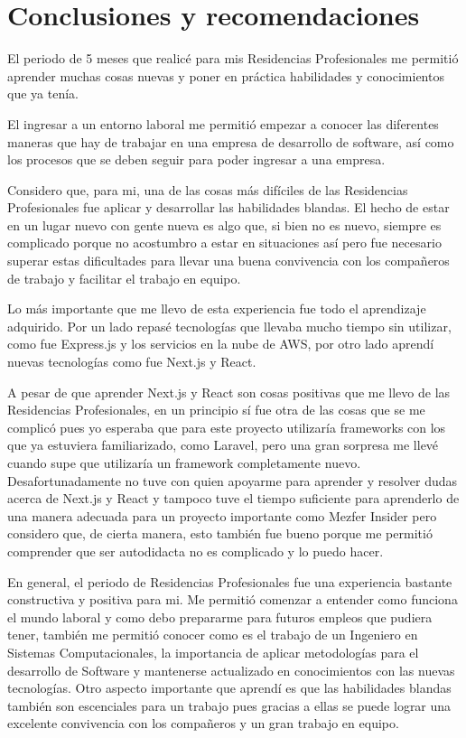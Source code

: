 \chapter{Conclusiones y recomendaciones}
El periodo de 5 meses que realicé para mis Residencias Profesionales me permitió aprender muchas cosas nuevas y poner en práctica habilidades y conocimientos que ya tenía.

El ingresar a un entorno laboral me permitió empezar a conocer las diferentes maneras que hay de trabajar en una empresa de desarrollo de software, así como los procesos que se deben seguir para poder ingresar a una empresa.

Considero que, para mi, una de las cosas más difíciles de las Residencias Profesionales fue aplicar y desarrollar las habilidades blandas. El hecho de estar en un lugar nuevo con gente nueva es algo que, si bien no es nuevo, siempre es complicado porque no acostumbro a estar en situaciones así pero fue necesario superar estas dificultades para llevar una buena convivencia con los compañeros de trabajo y facilitar el trabajo en equipo.

Lo más importante que me llevo de esta experiencia fue todo el aprendizaje adquirido. Por un lado repasé tecnologías que llevaba mucho tiempo sin utilizar, como fue Express.js y los servicios en la nube de AWS, por otro lado aprendí nuevas tecnologías como fue Next.js y React. 

A pesar de que aprender Next.js y React son cosas positivas que me llevo de las Residencias Profesionales, en un principio sí fue otra de las cosas que se me complicó pues yo esperaba que para este proyecto utilizaría frameworks con los que ya estuviera familiarizado, como Laravel, pero una gran sorpresa me llevé cuando supe que utilizaría un framework completamente nuevo. Desafortunadamente no tuve con quien apoyarme para aprender y resolver dudas acerca de Next.js y React y tampoco tuve el tiempo suficiente para aprenderlo de una manera adecuada para un proyecto importante como Mezfer Insider pero considero que, de cierta manera, esto también fue bueno porque me permitió comprender que ser autodidacta no es complicado y lo puedo hacer.

En general, el periodo de Residencias Profesionales fue una experiencia bastante constructiva y positiva para mi. Me permitió comenzar a entender como funciona el mundo laboral y como debo prepararme para futuros empleos que pudiera tener, también me permitió conocer como es el trabajo de un Ingeniero en Sistemas Computacionales, la importancia de aplicar metodologías para el desarrollo de Software y mantenerse actualizado en conocimientos con las nuevas tecnologías. Otro aspecto importante que aprendí es que las habilidades blandas también son escenciales para un trabajo pues gracias a ellas se puede lograr una excelente convivencia con los compañeros y un gran trabajo en equipo.

